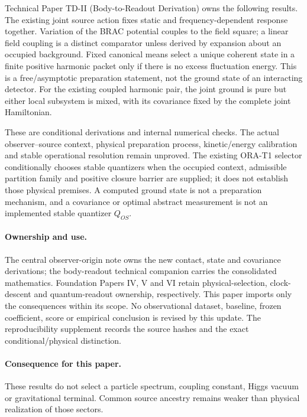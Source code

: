 \documentclass[11pt]{article}
\begin{document}
Technical Paper TD-II (Body-to-Readout Derivation) owns the following
results. The existing joint source action fixes static and frequency-dependent
response together. Variation of the BRAC potential couples to the field
square; a linear field coupling is a distinct comparator unless derived by
expansion about an occupied background. Fixed canonical means select a unique
coherent state in a finite positive harmonic packet only if there is no excess
fluctuation energy. This is a free/asymptotic preparation statement, not the
ground state of an interacting detector. For the existing coupled harmonic
pair, the joint ground is pure but either local subsystem is mixed, with its
covariance fixed by the complete joint Hamiltonian.

These are conditional derivations and internal numerical checks. The actual
observer--source context, physical preparation process, kinetic/energy
calibration and stable operational resolution remain unproved. The existing
ORA-T1 selector conditionally chooses stable quantizers when the occupied
context, admissible partition family and positive closure barrier are supplied;
it does not establish those physical premises. A computed ground state is not
a preparation mechanism, and a covariance or optimal abstract measurement is
not an implemented stable quantizer $Q_{OS}$.

\paragraph{Ownership and use.}
The central observer-origin note owns the new contact, state and covariance
derivations; the body-readout technical companion carries the consolidated
mathematics. Foundation Papers IV, V and VI retain physical-selection,
clock-descent and quantum-readout ownership, respectively. This paper imports
only the consequences within its scope. No observational dataset, baseline,
frozen coefficient, score or empirical conclusion is revised by this update.
The reproducibility supplement records the source hashes and the exact
conditional/physical distinction.


\paragraph{Consequence for this paper.}
These results do not select a particle spectrum, coupling constant, Higgs vacuum or gravitational terminal. Common source ancestry remains weaker than physical realization of those sectors.
\end{document}
